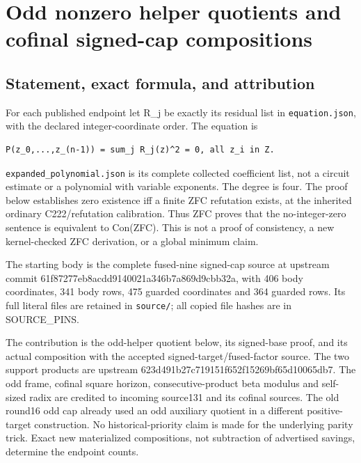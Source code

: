 \section{Odd nonzero helper quotients and cofinal signed-cap
compositions}\label{odd-nonzero-helper-quotients-and-cofinal-signed-cap-compositions}

\subsection{Statement, exact formula, and
attribution}\label{statement-exact-formula-and-attribution}

For each published endpoint let R\_j be exactly its residual list in
\texttt{equation.json}, with the declared integer-coordinate order. The
equation is

\begin{verbatim}
P(z_0,...,z_(n-1)) = sum_j R_j(z)^2 = 0, all z_i in Z.
\end{verbatim}

\texttt{expanded\_polynomial.json} is its complete collected coefficient
list, not a circuit estimate or a polynomial with variable exponents.
The degree is four. The proof below establishes zero existence iff a
finite ZFC refutation exists, at the inherited ordinary C222/refutation
calibration. Thus ZFC proves that the no-integer-zero sentence is
equivalent to Con(ZFC). This is not a proof of consistency, a new
kernel-checked ZFC derivation, or a global minimum claim.

The starting body is the complete fused-nine signed-cap source at
upstream commit 61f87277eb8acdd9140021a346b7a869d9cbb32a, with 406 body
coordinates, 341 body rows, 475 guarded coordinates and 364 guarded
rows. Its full literal files are retained in \texttt{source/}; all
copied file hashes are in SOURCE\_PINS.

The contribution is the odd-helper quotient below, its signed-base
proof, and its actual composition with the accepted
signed-target/fused-factor source. The two support products are upstream
623d491b27c719151f652f15269bf65d10065db7. The odd frame, cofinal square
horizon, consecutive-product beta modulus and self-sized radix are
credited to incoming source131 and its cofinal sources. The old round16
odd cap already used an odd auxiliary quotient in a different
positive-target construction. No historical-priority claim is made for
the underlying parity trick. Exact new materialized compositions, not
subtraction of advertised savings, determine the endpoint counts.

